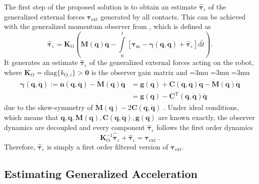 The first step of the proposed solution is to obtain an estimate $\hat{\bm{\tau}}_\varepsilon$ of the generalized external forces $\bm{\tau}_\mathrm{ext}$ generated by all contacts.
This can be achieved with the generalized momentum observer from \cite{DeLucaMat2003,DeLucaMat2004,Haddadin2014}, which is defined as
\begin{equation}
\hat{\bm{\tau}}_\mathrm{\varepsilon}=\bm{K}_\mathrm{O}
\left(
\bm{M}(\bm{q})\dot{\bm{q}}
-\int\limits_0^t
 [\bm{\tau}_\mathrm{m}
 -\bm{\gamma}(\bm{q},\dot{\bm{q}})
 +\hat{\bm{\tau}}_\mathrm{\varepsilon}
 ]\mathrm{d}\tilde{t} 
 \right).
\label{eqn:obs_qDD}
\end{equation}
%
It generates an estimate $\hat{\bm{\tau}}_\varepsilon$ of the generalized external forces acting on the robot, where $\bm{K}_\mathrm{O}=\mathrm{diag}\{k_{\mathrm{O},i}\}>\bm{0}$ is the observer gain matrix and
\begingroup %
\medmuskip=3mu
\thinmuskip=3mu
\thickmuskip=3mu
\begin{align}
\bm{\gamma}(\bm{q},\dot{\bm{q}}):=
\bm{n}(\bm{q},\dot{\bm{q}})-\dot{\bm{M}}(\bm{q})\dot{\bm{q}}
&=\bm{g}(\bm{q})
+\bm{C}(\bm{q},\dot{\bm{q}})\dot{\bm{q}}\nonumber
-\dot{\bm{M}}(\bm{q})\dot{\bm{q}}\\
&=
\bm{g}(\bm{q})-\bm{C}^\mathrm{T}(\bm{q},\dot{\bm{q}})\dot{\bm{q}}\;
\label{eqn:gamma}
\end{align}
\endgroup
%
due to the skew-symmetry of $\dot{\bm{M}}(\bm{q})-2\bm{C}(\bm{q},\dot{\bm{q}})$ \cite{DeLucaAlbHadHir2006}.
Under ideal conditions, which means that $\bm{q}, \dot{\bm{q}}, \bm{M}(\bm{q}), \bm{C}(\bm{q},\dot{\bm{q}}), \bm{g}(\bm{q})$ are known exactly, the observer dynamics are decoupled and every component $\hat{\bm{\tau}}_{\varepsilon}$ follows the first order dynamics
%
\begin{equation}
\bm{K}_\mathrm{O}^{-1}\hat{\dot{\bm{\tau}}}_{\varepsilon}+\hat{\bm{\tau}}_{\varepsilon}=\bm{\tau}_{\mathrm{ext}}\;.\label{eqn:obs_dynamic}
\end{equation}
%
Therefore, $\hat{\bm{\tau}}_{\varepsilon}$ is simply a first order filtered version of $\bm{\tau}_{\mathrm{ext}}$.

\subsection{Estimating Generalized Acceleration}


